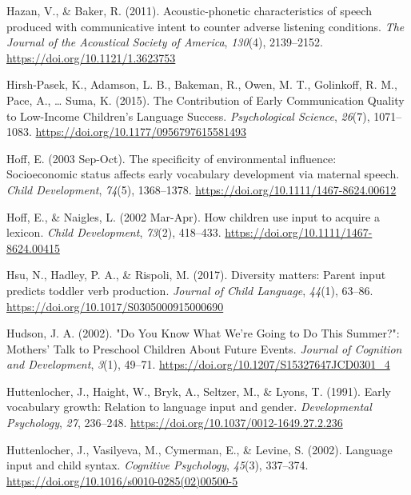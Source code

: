\documentclass[
  man,floatsintext]{apa6}
\newlength{\cslhangindent}
\newlength{\cslentryspacingunit} %
\newenvironment{CSLReferences}[2] %
 {%
  \setlength{\parindent}{0pt}
  \ifodd #1
  \let\oldpar\par
  \def\par{\hangindent=\cslhangindent\oldpar}
  \fi
  \setlength{\parskip}{#2\cslentryspacingunit}
 }%
 {}
\begin{document}
\begin{CSLReferences}{1}{0}
\leavevmode{}%
Hazan, V., \& Baker, R. (2011). Acoustic-phonetic characteristics of speech produced with communicative intent to counter adverse listening conditions. \emph{The Journal of the Acoustical Society of America}, \emph{130}(4), 2139--2152. \url{https://doi.org/10.1121/1.3623753}

\leavevmode{}%
Hirsh-Pasek, K., Adamson, L. B., Bakeman, R., Owen, M. T., Golinkoff, R. M., Pace, A., \ldots{} Suma, K. (2015). The {Contribution} of {Early Communication Quality} to {Low-Income Children}'s {Language Success}. \emph{Psychological Science}, \emph{26}(7), 1071--1083. \url{https://doi.org/10.1177/0956797615581493}

\leavevmode{}%
Hoff, E. (2003 Sep-Oct). The specificity of environmental influence: Socioeconomic status affects early vocabulary development via maternal speech. \emph{Child Development}, \emph{74}(5), 1368--1378. \url{https://doi.org/10.1111/1467-8624.00612}

\leavevmode{}%
Hoff, E., \& Naigles, L. (2002 Mar-Apr). How children use input to acquire a lexicon. \emph{Child Development}, \emph{73}(2), 418--433. \url{https://doi.org/10.1111/1467-8624.00415}

\leavevmode{}%
Hsu, N., Hadley, P. A., \& Rispoli, M. (2017). Diversity matters: Parent input predicts toddler verb production. \emph{Journal of Child Language}, \emph{44}(1), 63--86. \url{https://doi.org/10.1017/S0305000915000690}

\leavevmode{}%
Hudson, J. A. (2002). "{Do You Know What We}'re {Going} to {Do This Summer}?": {Mothers}' {Talk} to {Preschool Children About Future Events}. \emph{Journal of Cognition and Development}, \emph{3}(1), 49--71. \url{https://doi.org/10.1207/S15327647JCD0301_4}

\leavevmode{}%
Huttenlocher, J., Haight, W., Bryk, A., Seltzer, M., \& Lyons, T. (1991). Early vocabulary growth: {Relation} to language input and gender. \emph{Developmental Psychology}, \emph{27}, 236--248. \url{https://doi.org/10.1037/0012-1649.27.2.236}

\leavevmode{}%
Huttenlocher, J., Vasilyeva, M., Cymerman, E., \& Levine, S. (2002). Language input and child syntax. \emph{Cognitive Psychology}, \emph{45}(3), 337--374. \url{https://doi.org/10.1016/s0010-0285(02)00500-5}


\end{CSLReferences}
\end{document}
